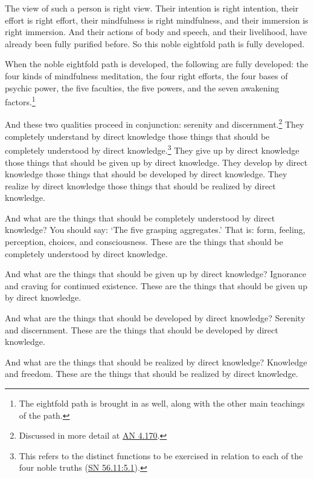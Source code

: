 \documentclass[12pt,openany]{book}%
\begin{document}
The view of such a person is right view. Their intention is right intention, their effort is right effort, their mindfulness is right mindfulness, and their immersion is right immersion. And their actions of body and speech, and their livelihood, have already been fully purified before. So this noble eightfold path is fully developed. 

When the noble eightfold path is developed, the following are fully developed: the four kinds of mindfulness meditation, the four right efforts, the four bases of psychic power, the five faculties, the five powers, and the seven awakening factors.\footnote{The eightfold path is brought in as well, along with the other main teachings of the path. } 

And these two qualities proceed in conjunction: serenity and discernment.\footnote{Discussed in more detail at \href{https://suttacentral.net/an4.170/en/sujato}{AN 4.170}. } They completely understand by direct knowledge those things that should be completely understood by direct knowledge.\footnote{This refers to the distinct functions to be exercised in relation to each of the four noble truths (\href{https://suttacentral.net/sn56.11/en/sujato\#5.1}{SN 56.11:5.1}). } They give up by direct knowledge those things that should be given up by direct knowledge. They develop by direct knowledge those things that should be developed by direct knowledge. They realize by direct knowledge those things that should be realized by direct knowledge. 

And what are the things that should be completely understood by direct knowledge? You should say: ‘The five grasping aggregates.’ That is: form, feeling, perception, choices, and consciousness. These are the things that should be completely understood by direct knowledge. 

And what are the things that should be given up by direct knowledge? Ignorance and craving for continued existence. These are the things that should be given up by direct knowledge. 

And what are the things that should be developed by direct knowledge? Serenity and discernment. These are the things that should be developed by direct knowledge. 

And what are the things that should be realized by direct knowledge? Knowledge and freedom. These are the things that should be realized by direct knowledge. 
\end{document}
